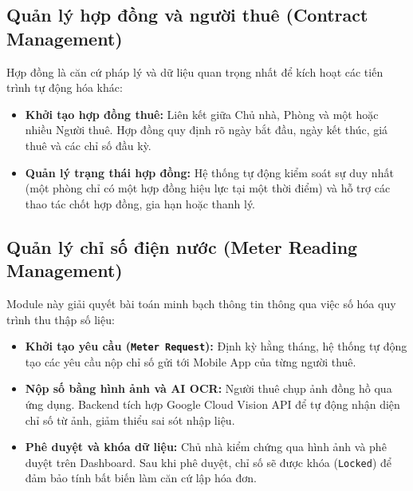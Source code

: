\subsection{Quản lý hợp đồng và người thuê (Contract Management)}
Hợp đồng là căn cứ pháp lý và dữ liệu quan trọng nhất để kích hoạt các tiến trình tự động hóa khác:
\begin{itemize}
    \item \textbf{Khởi tạo hợp đồng thuê:} Liên kết giữa Chủ nhà, Phòng và một hoặc nhiều Người thuê. Hợp đồng quy định rõ ngày bắt đầu, ngày kết thúc, giá thuê và các chỉ số đầu kỳ.
    \item \textbf{Quản lý trạng thái hợp đồng:} Hệ thống tự động kiểm soát sự duy nhất (một phòng chỉ có một hợp đồng hiệu lực tại một thời điểm) và hỗ trợ các thao tác chốt hợp đồng, gia hạn hoặc thanh lý.
\end{itemize}

\subsection{Quản lý chỉ số điện nước (Meter Reading Management)}
Module này giải quyết bài toán minh bạch thông tin thông qua việc số hóa quy trình thu thập số liệu:
\begin{itemize}
    \item \textbf{Khởi tạo yêu cầu (\texttt{Meter Request}):} Định kỳ hằng tháng, hệ thống tự động tạo các yêu cầu nộp chỉ số gửi tới Mobile App của từng người thuê.
    \item \textbf{Nộp số bằng hình ảnh và AI OCR:} Người thuê chụp ảnh đồng hồ qua ứng dụng. Backend tích hợp Google Cloud Vision API để tự động nhận diện chỉ số từ ảnh, giảm thiểu sai sót nhập liệu.
    \item \textbf{Phê duyệt và khóa dữ liệu:} Chủ nhà kiểm chứng qua hình ảnh và phê duyệt trên Dashboard. Sau khi phê duyệt, chỉ số sẽ được khóa (\texttt{Locked}) để đảm bảo tính bất biến làm căn cứ lập hóa đơn.
\end{itemize}

